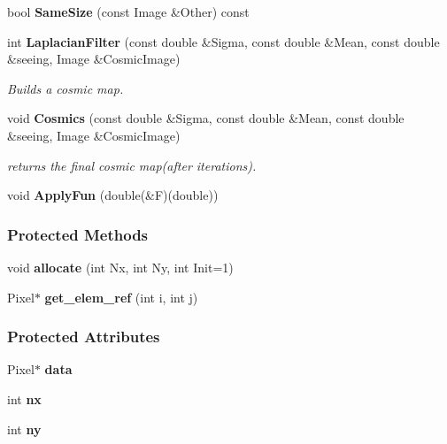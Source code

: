 \begin{CompactItemize}
\item 
{}
bool {\bf Same\-Size} (const Image \&Other) const\label{class_image_a65}

\item 
int {\bf Laplacian\-Filter} (const double \&Sigma, const double \&Mean, const double \&seeing, Image \&Cosmic\-Image)
\begin{CompactList}\small\item\em Builds a cosmic map.\item\end{CompactList}\item 
{}
void {\bf Cosmics} (const double \&Sigma, const double \&Mean, const double \&seeing, Image \&Cosmic\-Image)\label{class_image_a67}

\begin{CompactList}\small\item\em returns the final cosmic map(after iterations).\item\end{CompactList}\item 
{}
void {\bf Apply\-Fun} (double(\&F)(double))\label{class_image_a68}

\end{CompactItemize}
\subsubsection*{Protected Methods}
\begin{CompactItemize}
\item 
{}
void {\bf allocate} (int Nx, int Ny, int Init=1)\label{class_image_b0}

\item 
{}
Pixel$\ast$ {\bf get\_\-elem\_\-ref} (int i, int j)\label{class_image_b1}

\end{CompactItemize}
\subsubsection*{Protected Attributes}
\begin{CompactItemize}
\item 
{}
Pixel$\ast$ {\bf data}\label{class_image_n0}

\item 
{}
int {\bf nx}\label{class_image_n1}

\item 
{}
int {\bf ny}\label{class_image_n2}

\end{CompactItemize}
